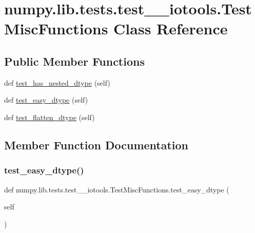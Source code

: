 \hypertarget{classnumpy_1_1lib_1_1tests_1_1test____iotools_1_1TestMiscFunctions}{}\section{numpy.\+lib.\+tests.\+test\+\_\+\+\_\+iotools.\+Test\+Misc\+Functions Class Reference}
\label{classnumpy_1_1lib_1_1tests_1_1test____iotools_1_1TestMiscFunctions}
\subsection*{Public Member Functions}
\begin{DoxyCompactItemize}
\item 
def \hyperlink{classnumpy_1_1lib_1_1tests_1_1test____iotools_1_1TestMiscFunctions_a6e191e9507a5dbda74e1b7b624fbd6af}{test\+\_\+has\+\_\+nested\+\_\+dtype} (self)
\item 
def \hyperlink{classnumpy_1_1lib_1_1tests_1_1test____iotools_1_1TestMiscFunctions_aa4a932ec3a9c591098812534a7c16933}{test\+\_\+easy\+\_\+dtype} (self)
\item 
def \hyperlink{classnumpy_1_1lib_1_1tests_1_1test____iotools_1_1TestMiscFunctions_ac3e0a4c301699ce208215758f3bb1bdc}{test\+\_\+flatten\+\_\+dtype} (self)
\end{DoxyCompactItemize}


\subsection{Member Function Documentation}
\mbox{\label{classnumpy_1_1lib_1_1tests_1_1test____iotools_1_1TestMiscFunctions_aa4a932ec3a9c591098812534a7c16933}} 
\subsubsection{\texorpdfstring{test\+\_\+easy\+\_\+dtype()}{test\_easy\_dtype()}}
{\footnotesize\ttfamily def numpy.\+lib.\+tests.\+test\+\_\+\+\_\+iotools.\+Test\+Misc\+Functions.\+test\+\_\+easy\+\_\+dtype (\begin{DoxyParamCaption}\item[{}]{self }\end{DoxyParamCaption})}

